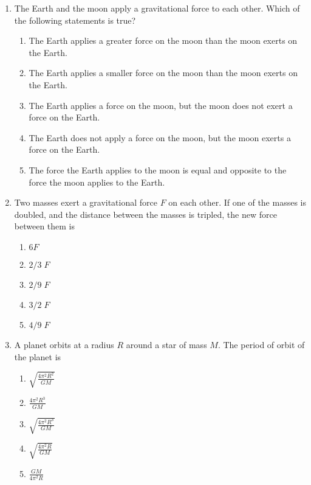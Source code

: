 \documentclass{../../oss-apphys}
\begin{document}
\begin{multicols}{2}
\begin{enumerate}[leftmargin=18pt]
  \item The Earth and the moon apply a gravitational force to each other.
    Which of the following statements is true?
    \begin{enumerate}[noitemsep,topsep=0pt,leftmargin=18pt]  
    \item The Earth applies a greater force on the moon than the moon exerts on
      the Earth.
    \item The Earth applies a smaller force on the moon than the moon exerts on
      the Earth.
    \item The Earth applies a force on the moon, but the moon does not exert a
      force on the Earth.
    \item The Earth does not apply a force on the moon, but the moon exerts a
      force on the Earth.
    \item The force the Earth applies to the moon is equal and opposite to the
      force the moon applies to the Earth.
    \end{enumerate}

    \columnbreak
    
  \item Two masses exert a gravitational force $F$ on each other. If one of the
    masses is doubled, and the distance between the masses is tripled, the
    new force between them is
    \begin{enumerate}[noitemsep,topsep=0pt,leftmargin=18pt]  
    \item $6F$
    \item $2/3\;F$
    \item $2/9\;F$
    \item $3/2\;F$
    \item $4/9\;F$
    \end{enumerate}

  \item A planet orbits at a radius $R$ around a star of mass $M$. The period of
    orbit of the planet is
    \begin{enumerate}[noitemsep,topsep=0pt,leftmargin=18pt]  
    \item $\displaystyle\sqrt{\frac{4\pi^2R^2}{GM}}$
    \item $\displaystyle\frac{4\pi^2R^3}{GM}$
    \item $\displaystyle\sqrt{\frac{4\pi^2R^3}{GM}}$
    \item $\displaystyle\sqrt{\frac{4\pi^2R}{GM}}$
    \item $\displaystyle\frac{GM}{4\pi^2R}$
    \end{enumerate}
  

\end{enumerate}
\end{multicols}
\end{document}
